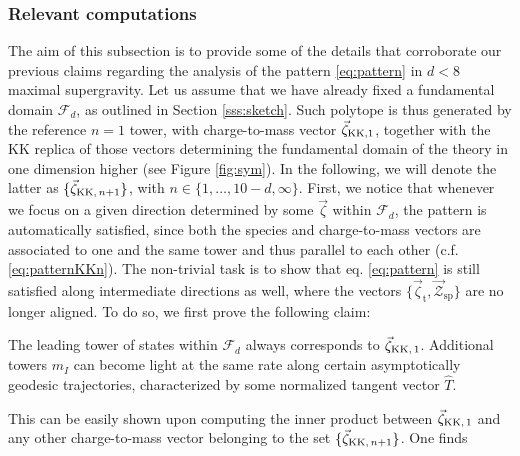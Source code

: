 \subsubsection{Relevant computations}
\label{sss:generalcomputations}
The aim of this subsection is to provide some of the details that corroborate our previous claims regarding the analysis of the pattern \eqref{eq:pattern} in $d<8$ maximal supergravity. Let us assume that we have already fixed a fundamental domain $\mathscr{F}_d$, as outlined in Section \ref{sss:sketch}. Such polytope is thus generated by the reference $n=1$ tower, with charge-to-mass vector $\vec{\zeta}_{\rm KK, 1}$, together with the KK replica of those vectors determining the fundamental domain of the theory in one dimension higher (see Figure \ref{fig:sym}). In the following, we will denote the latter as $\lbrace \vec{\zeta}_{{\rm KK,}\,n+1} \rbrace$, with $n\in\{1,\ldots,10-d,\infty\}$. 
First, we notice that whenever we focus on a given direction determined by some $\vec{\zeta}$ within $\mathscr{F}_d$, the pattern is automatically satisfied, since both the species and charge-to-mass vectors are associated to one and the same tower and thus parallel to each other (c.f. \eqref{eq:patternKKn}). The non-trivial task is to show that eq. \eqref{eq:pattern} is still satisfied along intermediate directions as well, where the vectors $\lbrace \vec{\zeta}_{\text{t}}, \vec{\mathcal{Z}}_{\text{sp}}\rbrace$ are no longer aligned. %
To do so, we first prove the following claim:
%
\begin{theorem}\label{claim1}
	The leading tower of states within $\mathscr{F}_d$ always corresponds to $\vec{\zeta}_{\rm KK,\, 1}$. Additional towers $m_I$ can become light at the same rate along certain asymptotically geodesic trajectories, characterized by some normalized tangent vector $\hat{T}$.
\end{theorem}
%
This can be easily shown upon computing the inner product between $\vec{\zeta}_{\rm KK,\, 1}$ and any other charge-to-mass vector belonging to the set $\lbrace \vec{\zeta}_{{\rm KK,}\,n+1} \rbrace$. One finds %
